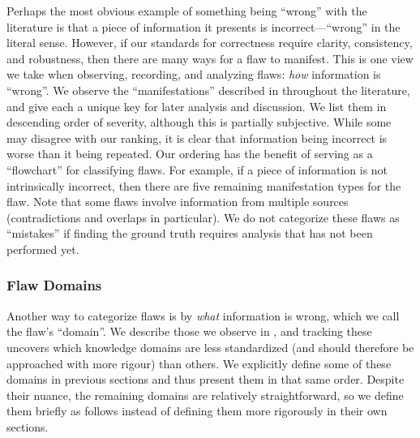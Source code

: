 Perhaps the most obvious example of something being ``wrong'' with the
literature is that a piece of information it presents is incorrect---``wrong''
in the literal sense. However, if our standards for correctness require
clarity, consistency, and robustness, then there are many ways for a flaw to
manifest. This is one view we take when observing, recording, and analyzing
flaws: \emph{how} information is ``wrong''. We observe the
``manifestations'' described in  throughout the
literature, and give each a unique key for later analysis and discussion. We
list them in descending order of severity, although this is partially
subjective. While some may disagree with our ranking, it is clear that
information being incorrect is worse than it being repeated. Our ordering has
the benefit of serving as a ``flowchart'' for classifying flaws. For example,
if a piece of information is not intrinsically incorrect, then there are five
remaining manifestation types for the flaw. Note that some flaws involve
information from multiple sources (contradictions and overlaps in particular).
We do not categorize these flaws as ``mistakes'' if finding the ground truth
requires analysis that has not been performed yet.



\subsubsection{Flaw Domains}\label{dmn-def}

Another way to categorize flaws is by \emph{what} information is wrong, which
we call the flaw's ``domain''. We describe those we observe in
, and tracking these uncovers which knowledge domains
are less standardized (and should therefore be approached with more rigour)
than others. We explicitly define some of these domains in previous
sections and thus present them in that same order. Despite their nuance, the
remaining domains are relatively straightforward, so we define them briefly as
follows instead of defining them more rigorously in their own sections.



